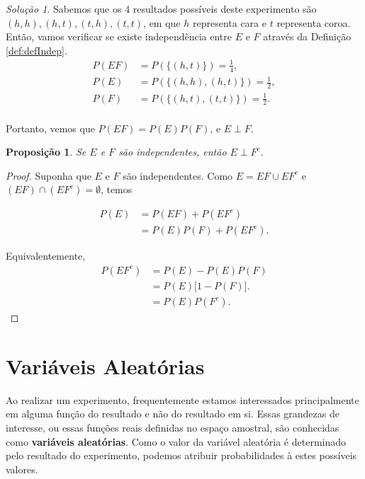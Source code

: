 \documentclass[]{book}
\newtheorem{proposition}{Proposição}[chapter]
\theoremstyle{definition}
\theoremstyle{definition}
\theoremstyle{definition}
\theoremstyle{remark}
\newtheorem*{solution}{Solução}
\begin{document}
\begin{solution}
\iffalse{} {Solução. } \fi{}Sabemos que os 4 resultados possíveis deste experimento são \((h,h),(h,t),(t,h),(t,t)\), em que \(h\) representa cara e \(t\) representa coroa.
Então, vamos verificar se existe independência entre \(E\) e \(F\) através da Definição \ref{def:defIndep}.
\begin{align}
P(EF) &= P(\{(h,t)\}) = \frac{1}{4},\\
P(E) &= P(\{(h,h),(h,t)\}) = \frac{1}{2},\\
P(F) &= P(\{(h,t),(t,t)\}) = \frac{1}{2}.\\
\end{align}

Portanto, vemos que \(P(EF) = P(E)P(F)\), e \(E \perp F\).
\end{solution}

\begin{proposition}
\protect\hypertarget{prp:unnamed-chunk-131}{}{\label{prp:unnamed-chunk-131} }Se \(E\) e \(F\) são independentes, então \(E\perp F^c\).
\end{proposition}

\begin{proof}
\iffalse{} {Prova. } \fi{}Suponha que \(E\) e \(F\) são independentes.
Como \(E=EF\cup EF^c\) e \((EF)\cap (EF^c)=\emptyset\), temos

\begin{align}
P(E) &= P(EF) + P(EF^c)\\
&=P(E)P(F) + P(EF^c).
\end{align}

Equivalentemente,
\begin{align}
P(EF^c) &= P(E) - P(E)P(F)\\
&=P(E)\big[1-P(F)\big].\\
&=P(E)P(F^c).
\end{align}
\end{proof}

\hypertarget{variuxe1veis-aleatuxf3rias}{%
\section{Variáveis Aleatórias}\label{variuxe1veis-aleatuxf3rias}}

Ao realizar um experimento, frequentemente estamos interessados principalmente em alguma função do resultado e não do resultado em si.
Essas grandezas de interesse, ou essas funções reais definidas no espaço amostral, são conhecidas como \textbf{variáveis aleatórias}.
Como o valor da variável aleatória é determinado pelo resultado do experimento, podemos atribuir probabilidades à estes possíveis valores.
\end{document}
